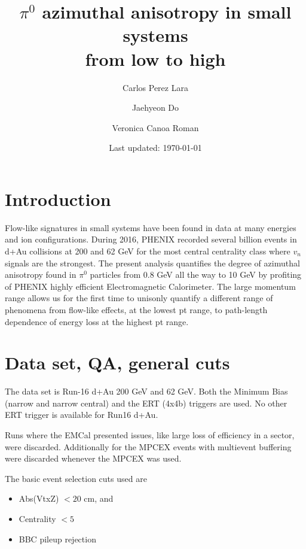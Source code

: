 \documentclass{article}
\title{$\pi^0$ azimuthal anisotropy in small systems\\ from low to high \pt}
\author{Carlos Perez Lara\and Jaehyeon Do \and Veronica Canoa Roman}
\date{Last updated: \today}
\newcommand{\pizero}{$\pi^0$}
\begin{document}
\maketitle
\tableofcontents
\section{Introduction}
Flow-like signatures in small systems have been found in data at many energies and ion configurations.
During 2016, PHENIX recorded several billion events in d+Au collisions at 200 and 62 GeV for the most central centrality class where $v_n$ signals are the strongest.
The present analysis quantifies the degree of azimuthal anisotropy found in \pizero{} particles from 0.8 GeV all the way to 10 GeV by profiting of PHENIX highly efficient Electromagnetic Calorimeter.
The large momentum range allows us for the first time to unisonly quantify a different range of phenomena from flow-like effects, at the lowest pt range, to path-length dependence of energy loss at the highest pt range.

\section{Data set, QA, general cuts}
The data set is Run-16 d+Au 200 GeV and 62 GeV.
Both the Minimum Bias (narrow and narrow central) and the ERT (4x4b) triggers are used. No other ERT trigger is available for Run16 d+Au.

Runs where the EMCal presented issues, like large loss of efficiency in a sector, were discarded.
Additionally for the MPCEX events with multievent buffering were discarded whenever the MPCEX was used.

The basic event selection cuts used are
\begin{itemize}
\item Abs(VtxZ) $< 20$ cm, and
\item Centrality $< 5$
\item BBC pileup rejection
\end{itemize}
\end{document}
